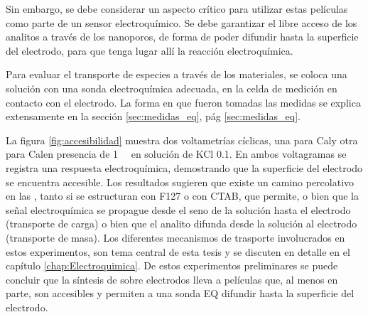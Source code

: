			Sin embargo, se debe considerar un aspecto crítico para utilizar estas películas como parte de un sensor electroquímico. Se debe garantizar el libre acceso de los analitos a través de los nanoporos, de forma de poder difundir hasta la superficie del electrodo, para que tenga lugar allí la reacción electroquímica.

			Para evaluar el transporte de especies a través de los materiales, se coloca una solución con una sonda electroquímica adecuada, en la celda de medición en contacto con el electrodo. La forma en que fueron tomadas las medidas se explica extensamente en la sección \ref{sec:medidas_eq}, pág \ref{sec:medidas_eq}. 

			La figura \ref{fig:accesibilidad} muestra dos voltametrías cíclicas, una para Cal\pdmF\space y otra para Cal\pdmC\space en presencia de \aminorutenio\space \SI{1}{\milli\Molar} en solución de KCl \SI{0.1}{\Molar}. En ambos voltagramas se registra una respuesta electroquímica, demostrando que la superficie del electrodo se encuentra accesible. Los resultados sugieren que existe un camino percolativo en las \pdm, tanto si se estructuran con F127 o con CTAB, que permite, o bien que la señal electroquímica se propague desde el seno de la solución hasta el electrodo (transporte de carga) o bien que el analito difunda desde la solución al electrodo (transporte de masa). Los diferentes mecanismos de trasporte involucrados en estos experimentos, son tema central de esta tesis y se discuten en detalle en el capítulo \ref{chap:Electroquimica}. De estos experimentos preliminares se puede concluir que la síntesis de \pdm\space sobre electrodos lleva a películas que, al menos en parte, son accesibles y permiten a una sonda EQ difundir hasta la superficie del electrodo.   

